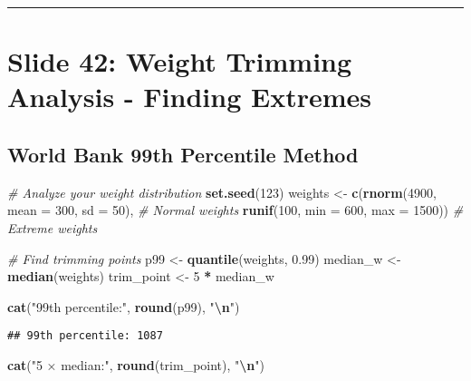 \documentclass[
]{article}
\newenvironment{Shaded}{\begin{snugshade}}{\end{snugshade}}
\newcommand{\AttributeTok}[1]{\textcolor[rgb]{0.13,0.29,0.53}{#1}}
\newcommand{\CommentTok}[1]{\textcolor[rgb]{0.56,0.35,0.01}{\textit{#1}}}
\newcommand{\DecValTok}[1]{\textcolor[rgb]{0.00,0.00,0.81}{#1}}
\newcommand{\FloatTok}[1]{\textcolor[rgb]{0.00,0.00,0.81}{#1}}
\newcommand{\FunctionTok}[1]{\textcolor[rgb]{0.13,0.29,0.53}{\textbf{#1}}}
\newcommand{\NormalTok}[1]{#1}
\newcommand{\OtherTok}[1]{\textcolor[rgb]{0.56,0.35,0.01}{#1}}
\newcommand{\SpecialCharTok}[1]{\textcolor[rgb]{0.81,0.36,0.00}{\textbf{#1}}}
\newcommand{\StringTok}[1]{\textcolor[rgb]{0.31,0.60,0.02}{#1}}
\begin{document}
\begin{center}\rule{0.5\linewidth}{0.5pt}\end{center}

\section{Slide 42: Weight Trimming Analysis - Finding
Extremes}\label{slide-42-weight-trimming-analysis---finding-extremes}

\subsection{World Bank 99th Percentile
Method}\label{world-bank-99th-percentile-method}

\begin{Shaded}
\begin{Highlighting}[]
\CommentTok{\# Analyze your weight distribution}
\FunctionTok{set.seed}\NormalTok{(}\DecValTok{123}\NormalTok{)}
\NormalTok{weights }\OtherTok{\textless{}{-}} \FunctionTok{c}\NormalTok{(}\FunctionTok{rnorm}\NormalTok{(}\DecValTok{4900}\NormalTok{, }\AttributeTok{mean =} \DecValTok{300}\NormalTok{, }\AttributeTok{sd =} \DecValTok{50}\NormalTok{),  }\CommentTok{\# Normal weights}
            \FunctionTok{runif}\NormalTok{(}\DecValTok{100}\NormalTok{, }\AttributeTok{min =} \DecValTok{600}\NormalTok{, }\AttributeTok{max =} \DecValTok{1500}\NormalTok{))  }\CommentTok{\# Extreme weights}

\CommentTok{\# Find trimming points}
\NormalTok{p99 }\OtherTok{\textless{}{-}} \FunctionTok{quantile}\NormalTok{(weights, }\FloatTok{0.99}\NormalTok{)}
\NormalTok{median\_w }\OtherTok{\textless{}{-}} \FunctionTok{median}\NormalTok{(weights)}
\NormalTok{trim\_point }\OtherTok{\textless{}{-}} \DecValTok{5} \SpecialCharTok{*}\NormalTok{ median\_w}

\FunctionTok{cat}\NormalTok{(}\StringTok{"99th percentile:"}\NormalTok{, }\FunctionTok{round}\NormalTok{(p99), }\StringTok{"}\SpecialCharTok{\textbackslash{}n}\StringTok{"}\NormalTok{)}
\end{Highlighting}
\end{Shaded}

\begin{verbatim}
## 99th percentile: 1087
\end{verbatim}

\begin{Shaded}
\begin{Highlighting}[]
\FunctionTok{cat}\NormalTok{(}\StringTok{"5 × median:"}\NormalTok{, }\FunctionTok{round}\NormalTok{(trim\_point), }\StringTok{"}\SpecialCharTok{\textbackslash{}n}\StringTok{"}\NormalTok{)}
\end{Highlighting}
\end{Shaded}
\end{document}
